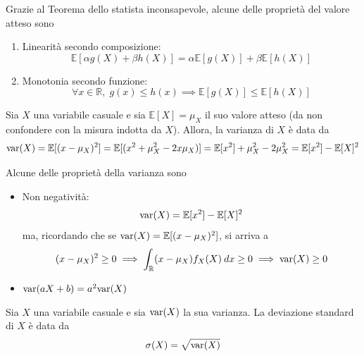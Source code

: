             Grazie al Teorema dello statista inconsapevole, alcune delle proprietà del valore atteso sono
            \begin{enumerate}
                \item Linearità secondo composizione:
                \[
                    \mathbb{E}[\alpha g(X) + \beta h(X)] = \alpha \mathbb{E}[g(X)] + \beta \mathbb{E}[h(X)]
                \]

                \item Monotonia secondo funzione:
                \[
                    \forall x \in \mathbb{R}, \; g(x) \leq h(x) \implies \mathbb{E}[g(X)] \leq \mathbb{E}[h(X)]
                \]
            \end{enumerate}


            \begin{definition}
                Sia $X$ una variabile casuale e sia $\mathbb{E}[X] = \mu_{X}$ il suo valore atteso (da non confondere con la misura indotta da $X$).
                Allora, la varianza di $X$ è data da
                \[
                    \textnormal{var}(X) = \mathbb{E}[(x - \mu_{X})^{2}] = \mathbb{E}[(x^{2} + \mu_{X}^{2} - 2 x \mu_{X})] = \mathbb{E}[x^{2}] + \mu_{X}^{2} - 2 \mu_{X}^{2} = \mathbb{E}[x^{2}] - \mathbb{E}[X]^{2}
                \]
            \end{definition}

            Alcune delle proprietà della varianza sono
            \begin{itemize}
                \item Non negatività:
                \[
                    \textnormal{var}(X) = \mathbb{E}[x^{2}] - \mathbb{E}[X]^{2}
                \]
                ma, ricordando che se $\textnormal{var}(X) = \mathbb{E}[(x - \mu_{X})^{2}]$, si arriva a
                \[
                    (x - \mu_{X})^{2} \geq 0 \implies \int_{\mathbb{R}} (x - \mu_{X}) f_{X}(X) \: dx \geq 0 \implies \textnormal{var}(X) \geq 0
                \]
                \item $\textnormal{var}(aX + b) = a^{2} \textnormal{var}(X)$
            \end{itemize}

            \begin{definition}
                Sia $X$ una variabile casuale e sia $\textnormal{var}(X)$ la sua varianza.
                La deviazione standard di $X$ è data da
                \[
                    \sigma(X) = \sqrt{\textnormal{var}(X)}
                \]
            \end{definition}

